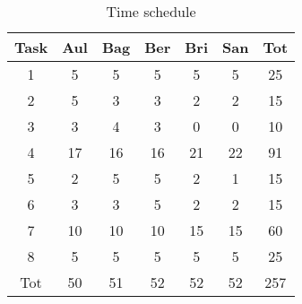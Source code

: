 \documentclass[10pt,twocolumn,letterpaper]{article}
\begin{document}
\begin{table}[h!]
    \centering
    \begin{tabular}{|c|c|c|c|c|c|c|}
        \hline
        \rowcolor{lightergray}
        Task & Aul & Bag & Ber & Bri & San & Tot\\ 
        \hline
        1 & 5 & 5 & 5 & 5 & 5 & 25 \\
        \hline
        2 & 5 & 3 & 3 & 2 & 2 & 15 \\
        \hline
        3 & 3 & 4 & 3 & 0 & 0 & 10 \\
        \hline
        4 & 17 & 16 & 16 & 21 & 22 & 91 \\
        \hline
        5 & 2 & 5 & 5 & 2 & 1 & 15 \\
        \hline
        6 & 3 & 3 & 5 & 2 & 2 & 15 \\
        \hline
        7 & 10 & 10 & 10 & 15 & 15 & 60 \\
        \hline
        8 & 5 & 5 & 5 & 5 & 5 & 25 \\
        \hline
        Tot & 50 & 51 & 52 & 52 & 52 & 257 \\
        \hline
    \end{tabular}
    \caption{Time schedule}
    \label{table:TimeSchedule}
\end{table}





{\small


}
\end{document}

